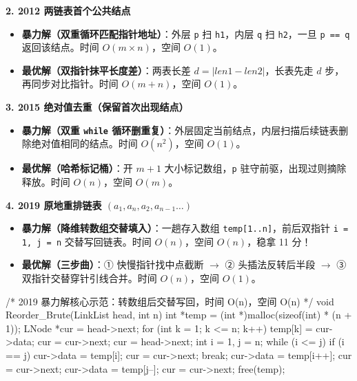 \documentclass[10pt,a4paper]{ctexart}
\begin{document}
\par\addvspace{2pt}\noindent\textbf{2. 2012 两链表首个公共结点}\par

\begin{itemize}

\item \textbf{暴力解（双重循环匹配指针地址）}：外层 \texttt{p} 扫 \texttt{h1}，内层 \texttt{q} 扫 \texttt{h2}，一旦 \texttt{p == q} 返回该结点。时间 $O(m \times n)$，空间 $O(1)$。

\item \textbf{最优解（双指针抹平长度差）}：两表长差 $d = |len1 - len2|$，长表先走 $d$ 步，再同步对比指针。时间 $O(m + n)$，空间 $O(1)$。

\end{itemize}

\par\addvspace{2pt}\noindent\textbf{3. 2015 绝对值去重（保留首次出现结点）}\par

\begin{itemize}

\item \textbf{暴力解（双重 \texttt{while} 循环删重复）}：外层固定当前结点，内层扫描后续链表删除绝对值相同的结点。时间 $O(n^2)$，空间 $O(1)$。

\item \textbf{最优解（哈希标记桶）}：开 $m+1$ 大小标记数组，\texttt{p} 驻守前驱，出现过则摘除释放。时间 $O(n)$，空间 $O(m)$。

\end{itemize}

\par\addvspace{2pt}\noindent\textbf{4. 2019 原地重排链表 $(a_1, a_n, a_2, a_{n-1}\dots)$}\par

\begin{itemize}

\item \textbf{暴力解（降维转数组交替填入）}：一趟存入数组 \texttt{temp[1..n]}，前后双指针 \texttt{i = 1, j = n} 交替写回链表。时间 $O(n)$，空间 $O(n)$，稳拿 11 分！

\item \textbf{最优解（三步曲）}：① 快慢指针找中点截断 $\to$ ② 头插法反转后半段 $\to$ ③ 双指针交替穿针引线合并。时间 $O(n)$，空间 $O(1)$。

\end{itemize}

\begin{codebox}
/* 2019 暴力解核心示范：转数组后交替写回，时间 O(n)，空间 O(n) */
void Reorder_Brute(LinkList head, int n) {
    int *temp = (int *)malloc(sizeof(int) * (n + 1));
    LNode *cur = head->next;
    for (int k = 1; k <= n; k++) { temp[k] = cur->data; cur = cur->next; }
    cur = head->next;
    int i = 1, j = n;
    while (i <= j) {
        if (i == j) { cur->data = temp[i]; cur = cur->next; break; }
        cur->data = temp[i++]; cur = cur->next;
        cur->data = temp[j--]; cur = cur->next;
    }
    free(temp);
}
\end{codebox}
\end{document}
